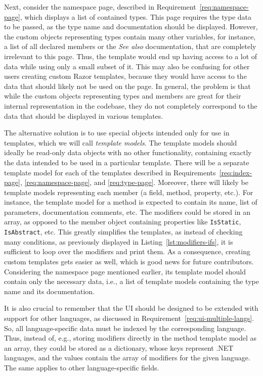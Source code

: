 Next, consider the namespace page, described in Requirement~\ref{req:namespace-page}, which displays a list of contained types.
This page requires the type data to be passed, as the type name and documentation should be displayed.
However, the custom objects representing types contain many other variables, for instance, a list of all declared members or the \textit{See also} documentation, that are completely irrelevant to this page.
Thus, the template would end up having access to a lot of data while using only a small subset of it.
This may also be confusing for other users creating custom Razor templates, because they would have access to the data that should likely not be used on the page.
In general, the problem is that while the custom objects representing types and members are great for their internal representation in the codebase, they do not completely correspond to the data that should be displayed in various templates.

The alternative solution is to use special objects intended only for use in templates, which we will call \textit{template models}.
The template models should ideally be read-only data objects with no other functionality, containing exactly the data intended to be used in a particular template.
There will be a separate template model for each of the templates described in Requirements~\ref{req:index-page}, \ref{req:namespace-page}, and \ref{req:type-page}.
Moreover, there will likely be template models representing each member (a field, method, property, etc.).
For instance, the template model for a method is expected to contain its name, list of parameters, documentation comments, etc.
The modifiers could be stored in an array, as opposed to the member object containing properties like \texttt{IsStatic}, \texttt{IsAbstract}, etc.
This greatly simplifies the templates, as instead of checking many conditions, as previously displayed in Listing~\ref{lst:modifiers-ifs}, it is sufficient to loop over the modifiers and print them. 
As a consequence, creating custom templates gets easier as well, which is good news for future contributors.
Considering the namespace page mentioned earlier, its template model should contain only the necessary data, i.e., a list of template models containing the type name and its documentation. 

It is also crucial to remember that the UI should be designed to be extended with support for other languages, as discussed in Requirement~\ref{req:ui-multiple-langs}.
So, all language-specific data must be indexed by the corresponding language.
Thus, instead of, e.g., storing modifiers directly in the method template model as an array, they could be stored as a dictionary, whose keys represent .NET languages, and the values contain the array of modifiers for the given language.
The same applies to other language-specific fields.


